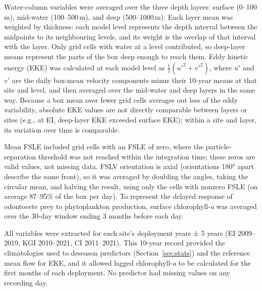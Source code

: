 \documentclass[11pt]{article}
\newcommand{\chla}{chlorophyll-\textit{a}}
\newcommand{\unit}[1]{\,#1}
\begin{document}
Water-column variables were averaged over the three depth layers: surface (0--100\unit{m}), mid-water (100--500\unit{m}), and deep (500--1000\unit{m}). Each layer mean was weighted by thickness: each model level represents the depth interval between the midpoints to its neighbouring levels, and its weight is the overlap of that interval with the layer. Only grid cells with water at a level contributed, so deep-layer means represent the parts of the box deep enough to reach them. Eddy kinetic energy (EKE) was calculated at each model level as $\frac{1}{2}(u'^2 + v'^2)$, where $u'$ and $v'$ are the daily box-mean velocity components minus their 10-year means at that site and level, and then averaged over the mid-water and deep layers in the same way. Because a box mean over fewer grid cells averages out less of the eddy variability, absolute EKE values are not directly comparable between layers or sites (e.g., at EI, deep-layer EKE exceeded surface EKE); within a site and layer, its variation over time is comparable.

Mean FSLE included grid cells with an FSLE of zero, where the particle-separation threshold was not reached within the integration time; these zeros are valid values, not missing data. FSLV orientation is axial (orientations 180° apart describe the same front), so it was averaged by doubling the angles, taking the circular mean, and halving the result, using only the cells with nonzero FSLE (on average 87--95\% of the box per day). To represent the delayed response of odontocete prey to phytoplankton production, surface \chla{} was averaged over the 30-day window ending 3 months before each day.

All variables were extracted for each site's deployment years ± 5 years (EI 2009--2019, KGI 2010--2021, CI 2011--2021). This 10-year record provided the climatologies used to deseason predictors (Section~\ref{sec:stats}) and the reference mean flow for EKE, and it allowed lagged \chla{} to be calculated for the first months of each deployment. No predictor had missing values on any recording day.
\end{document}
